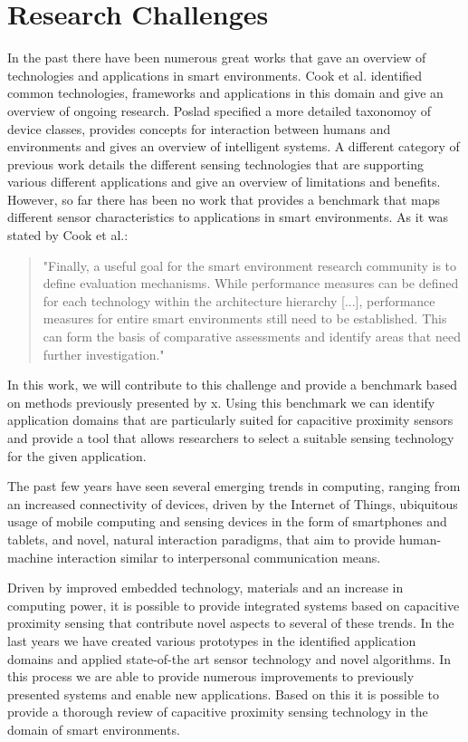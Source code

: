 \section{Research Challenges}
In the past there have been numerous great works that gave an overview of technologies and applications in smart environments. Cook et al. identified common technologies, frameworks and applications in this domain and give an overview of ongoing research. Poslad specified a more detailed taxonomoy of device classes, provides concepts for interaction between humans and environments and gives an overview of intelligent systems. A different category  of previous work details the different sensing technologies that are supporting various different applications and give an overview of limitations and benefits. However, so far there has been no work that provides a benchmark that maps different sensor characteristics to applications in smart environments. As it was stated by Cook et al.:
\begin{quote}
"Finally, a useful goal for the smart environment research community is to define evaluation mechanisms. While performance measures can be defined for each technology within the architecture hierarchy [...], performance measures for entire smart environments still need to be established. This can form the basis of comparative assessments and identify areas that need further investigation."
\end{quote}
In this work, we will contribute to this challenge and provide a benchmark based on methods previously presented by x. Using this benchmark we can identify application domains that are particularly suited for capacitive proximity sensors and provide a tool that allows researchers to select a suitable sensing technology for the given application.

The past few years have seen several emerging trends in computing, ranging from an increased connectivity of devices, driven by the Internet of Things, ubiquitous usage of mobile computing and sensing devices in the form of smartphones and tablets, and novel, natural interaction paradigms, that aim to provide human-machine interaction similar to interpersonal communication means. 

Driven by improved embedded technology, materials and an increase in computing power, it is possible to provide integrated systems based on capacitive proximity sensing that contribute novel aspects to several of these trends. In the last years we have created various prototypes in the identified application domains and applied state-of-the art sensor technology and novel algorithms. In this process we are able to provide numerous improvements to previously presented systems and enable new applications. Based on this it is possible to provide a thorough review of capacitive proximity sensing technology in the domain of smart environments.
